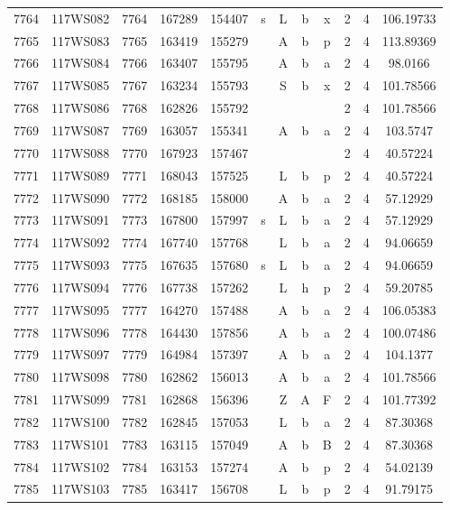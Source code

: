 \begin{tabular}{|*{12}{c|}}
7764 & 117WS082 & 7764 & 167289 & 154407 & s & L & b & x & 2 & 4 & 106.19733 \\ 
7765 & 117WS083 & 7765 & 163419 & 155279 &  & A & b & p & 2 & 4 & 113.89369 \\ 
7766 & 117WS084 & 7766 & 163407 & 155795 &  & A & b & a & 2 & 4 & 98.0166 \\ 
7767 & 117WS085 & 7767 & 163234 & 155793 &  & S & b & x & 2 & 4 & 101.78566 \\ 
7768 & 117WS086 & 7768 & 162826 & 155792 &  &  &  &  & 2 & 4 & 101.78566 \\ 
7769 & 117WS087 & 7769 & 163057 & 155341 &  & A & b & a & 2 & 4 & 103.5747 \\ 
7770 & 117WS088 & 7770 & 167923 & 157467 &  &  &  &  & 2 & 4 & 40.57224 \\ 
7771 & 117WS089 & 7771 & 168043 & 157525 &  & L & b & p & 2 & 4 & 40.57224 \\ 
7772 & 117WS090 & 7772 & 168185 & 158000 &  & A & b & a & 2 & 4 & 57.12929 \\ 
7773 & 117WS091 & 7773 & 167800 & 157997 & s & L & b & a & 2 & 4 & 57.12929 \\ 
7774 & 117WS092 & 7774 & 167740 & 157768 &  & L & b & a & 2 & 4 & 94.06659 \\ 
7775 & 117WS093 & 7775 & 167635 & 157680 & s & L & b & a & 2 & 4 & 94.06659 \\ 
7776 & 117WS094 & 7776 & 167738 & 157262 &  & L & h & p & 2 & 4 & 59.20785 \\ 
7777 & 117WS095 & 7777 & 164270 & 157488 &  & A & b & a & 2 & 4 & 106.05383 \\ 
7778 & 117WS096 & 7778 & 164430 & 157856 &  & A & b & a & 2 & 4 & 100.07486 \\ 
7779 & 117WS097 & 7779 & 164984 & 157397 &  & A & b & a & 2 & 4 & 104.1377 \\ 
7780 & 117WS098 & 7780 & 162862 & 156013 &  & A & b & a & 2 & 4 & 101.78566 \\ 
7781 & 117WS099 & 7781 & 162868 & 156396 &  & Z & A & F & 2 & 4 & 101.77392 \\ 
7782 & 117WS100 & 7782 & 162845 & 157053 &  & L & b & a & 2 & 4 & 87.30368 \\ 
7783 & 117WS101 & 7783 & 163115 & 157049 &  & A & b & B & 2 & 4 & 87.30368 \\ 
7784 & 117WS102 & 7784 & 163153 & 157274 &  & A & b & p & 2 & 4 & 54.02139 \\ 
7785 & 117WS103 & 7785 & 163417 & 156708 &  & L & b & p & 2 & 4 & 91.79175 \\ 

\end{tabular}
